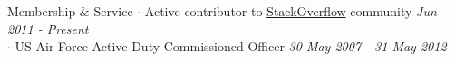 
\begin{rSection}{Membership \& Service}
  $\cdot$ Active contributor to \href{http://stackoverflow.com/users/822162/clayton-stanley}{StackOverflow} community
  \hfill {\em Jun 2011 - Present} \\
  $\cdot$ US Air Force Active-Duty Commissioned Officer
  \hfill {\em 30 May 2007 - 31 May 2012}
\end{rSection}

